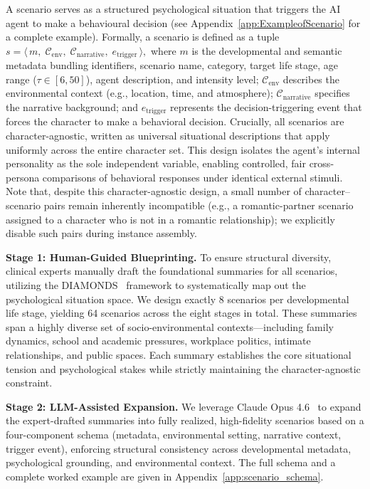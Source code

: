 \documentclass{article}
\begin{document}
A scenario serves as a structured psychological situation that triggers the AI agent to make a behavioural decision (see Appendix~\ref{app:ExampleofScenario} for a complete example). 
Formally, a scenario is defined as a tuple
  \(
  s = \bigl\langle\,
    m,\;
    \mathcal{C}_{\mathrm{env}},\; \mathcal{C}_{\mathrm{narrative}},\; e_{\mathrm{trigger}}
  \,\bigr\rangle,
  \)
where $m$ is the developmental and semantic metadata bundling identifiers, scenario name, category, target life stage, age range ($\tau \in [6,50]$), agent description, and intensity level; $\mathcal{C}_{\mathrm{env}}$ describes the environmental context (e.g., location, time, and atmosphere); $\mathcal{C}_{\mathrm{narrative}}$ specifies the narrative background; and $e_{\mathrm{trigger}}$ represents the decision-triggering event that forces the character to make a behavioral decision. Crucially, all scenarios are character-agnostic, written as universal situational descriptions that apply uniformly across the entire character set. This design isolates the agent's internal personality as the sole independent variable, enabling controlled, fair cross-persona comparisons of behavioral responses under identical external stimuli. Note that, despite this character-agnostic design, a small number of character--scenario pairs remain inherently incompatible (e.g., a romantic-partner scenario assigned to a character who is not in a romantic relationship); we explicitly disable such pairs during instance assembly.

\textbf{Stage 1: Human-Guided Blueprinting.} 
To ensure structural diversity, clinical experts manually draft the foundational summaries for all scenarios, utilizing the DIAMONDS~\cite{rauthmann2014diamonds} framework to systematically map out the psychological situation space. We design exactly 8 scenarios per developmental life stage, yielding 64 scenarios across the eight stages in total. These summaries span a highly diverse set of socio-environmental contexts—including family dynamics, school and academic pressures, workplace politics, intimate relationships, and public spaces. Each summary establishes the core situational tension and psychological stakes while strictly maintaining the character-agnostic constraint.

\textbf{Stage 2: LLM-Assisted Expansion.}
We leverage Claude Opus 4.6~\cite{anthropic2026opus46} to expand the expert-drafted summaries into fully realized, high-fidelity scenarios based on a four-component schema (metadata, environmental setting, narrative context, trigger event), enforcing structural consistency across developmental metadata, psychological grounding, and environmental context. The full schema and a complete worked example are given in Appendix~\ref{app:scenario_schema}.
\end{document}
